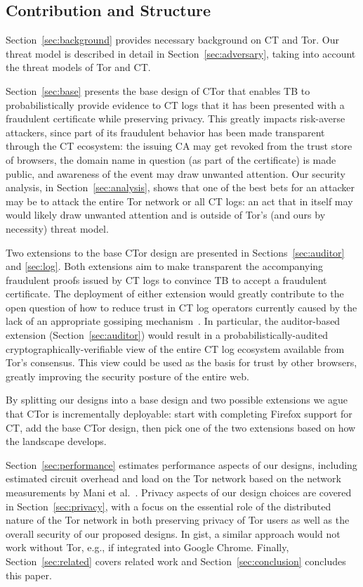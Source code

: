 \subsection{Contribution and Structure}
Section~\ref{sec:background} provides necessary background on CT and Tor. Our
threat model is described in detail in Section~\ref{sec:adversary}, taking into
account the threat models of Tor and CT\@.

Section~\ref{sec:base} presents the base design of CTor that enables TB to
probabilistically provide evidence to CT logs that it has been presented with a
fraudulent certificate while preserving privacy. This greatly impacts
risk-averse attackers, since part of its fraudulent behavior has been made
transparent through the CT ecosystem: the issuing CA may get revoked from the
trust store of browsers, the domain name in question (as part of the
certificate) is made public, and awareness of the event may draw unwanted
attention. Our security analysis, in Section~\ref{sec:analysis}, shows that one
of the best bets for an attacker may be to attack the entire Tor network or all
CT logs: an act that in itself may would likely draw unwanted attention and is
outside of Tor's (and ours by necessity) threat model.

Two extensions to the base CTor design are presented in
Sections~\ref{sec:auditor} and \ref{sec:log}. Both extensions aim to make
transparent the accompanying fraudulent proofs issued by CT logs to convince TB
to accept a fraudulent certificate. The deployment of either extension would
greatly contribute to the open question of how to reduce trust in CT log
operators currently caused by the lack of an appropriate gossiping
mechanism~\cite{minimal-gossip,nordberg}. In particular, the auditor-based
extension (Section~\ref{sec:auditor}) would result in a
probabilistically-audited cryptographically-verifiable view of the entire CT log
ecosystem available from Tor's consensus. This view could be used as the basis
for trust by other browsers, greatly improving the security posture of the
entire web.

By splitting our designs into a base design and two possible extensions we ague
that CTor is incrementally deployable: start with completing Firefox support for
CT, add the base CTor design, then pick one of the two extensions based on how
the landscape develops.

Section~\ref{sec:performance} estimates performance aspects of our designs,
including estimated circuit overhead and load on the Tor network based on the
network measurements by Mani et al.~\cite{mani}. Privacy aspects of our design
choices are covered in Section~\ref{sec:privacy}, with a focus on the essential
role of the distributed nature of the Tor network in both preserving privacy of
Tor users as well as the overall security of our proposed designs. In gist, a
similar approach would not work without Tor, e.g., if integrated into Google
Chrome. Finally, Section~\ref{sec:related} covers related work and
Section~\ref{sec:conclusion} concludes this paper.


